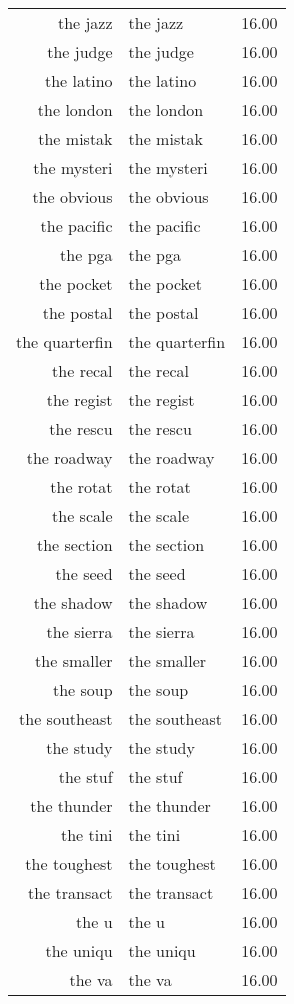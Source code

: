 \begin{table}[ht]
\begin{tabular}{rlr}
  the jazz & the jazz & 16.00 \\ 
  the judge & the judge & 16.00 \\ 
  the latino & the latino & 16.00 \\ 
  the london & the london & 16.00 \\ 
  the mistak & the mistak & 16.00 \\ 
  the mysteri & the mysteri & 16.00 \\ 
  the obvious & the obvious & 16.00 \\ 
  the pacific & the pacific & 16.00 \\ 
  the pga & the pga & 16.00 \\ 
  the pocket & the pocket & 16.00 \\ 
  the postal & the postal & 16.00 \\ 
  the quarterfin & the quarterfin & 16.00 \\ 
  the recal & the recal & 16.00 \\ 
  the regist & the regist & 16.00 \\ 
  the rescu & the rescu & 16.00 \\ 
  the roadway & the roadway & 16.00 \\ 
  the rotat & the rotat & 16.00 \\ 
  the scale & the scale & 16.00 \\ 
  the section & the section & 16.00 \\ 
  the seed & the seed & 16.00 \\ 
  the shadow & the shadow & 16.00 \\ 
  the sierra & the sierra & 16.00 \\ 
  the smaller & the smaller & 16.00 \\ 
  the soup & the soup & 16.00 \\ 
  the southeast & the southeast & 16.00 \\ 
  the study & the study & 16.00 \\ 
  the stuf & the stuf & 16.00 \\ 
  the thunder & the thunder & 16.00 \\ 
  the tini & the tini & 16.00 \\ 
  the toughest & the toughest & 16.00 \\ 
  the transact & the transact & 16.00 \\ 
  the u & the u & 16.00 \\ 
  the uniqu & the uniqu & 16.00 \\ 
  the va & the va & 16.00 \\ 

\end{tabular}
\end{table}
